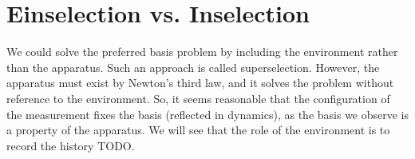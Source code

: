 %
%

\section{Einselection vs. Inselection}
We could solve the preferred basis problem by including the environment rather than the apparatus. Such an approach is called superselection. However, the apparatus must exist by Newton's third law, and it solves the problem without reference to the environment. So, it seems reasonable that the configuration of the measurement fixes the basis (reflected in dynamics), as the basis we observe is a property of the apparatus. We will see that the role of the environment is to record the history TODO.
